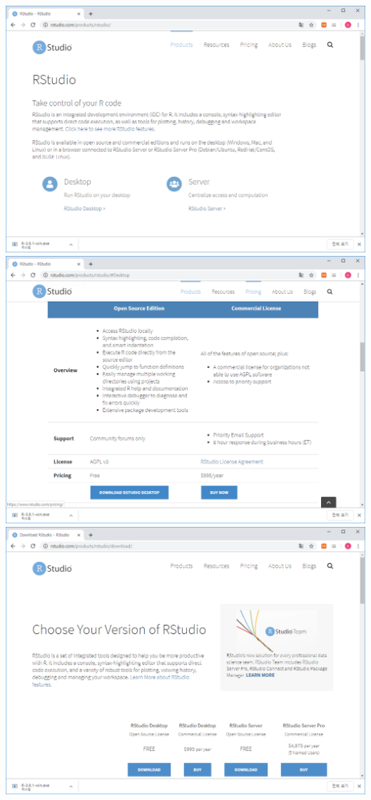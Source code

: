 \documentclass[]{book}
\begin{document}
\begin{itemize}
  \includegraphics{images/01-07.PNG}\\
  \includegraphics{images/01-08.PNG}\\
  \includegraphics{images/01-09.PNG}\\

\end{itemize}
\end{document}
